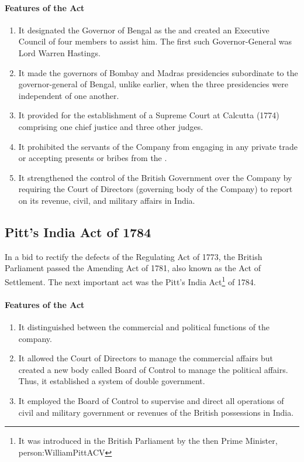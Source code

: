 \paragraph{Features of the Act}

\begin{enumerate}
  \item It designated the Governor of Bengal as the  and created an Executive Council of four members to assist him. The first such Governor-General was Lord Warren Hastings.
  \item It made the governors of Bombay and Madras presidencies subordinate to the governor-general of Bengal, unlike earlier, when the three presidencies were independent of one another.
  \item It provided for the establishment of a Supreme Court at Calcutta (1774) comprising one chief justice and three other judges.
  \item It prohibited the servants of the Company from engaging in any private trade or accepting presents or bribes from the .
  \item It strengthened the control of the British Government over the Company by requiring the Court of Directors (governing body of the Company) to report on its revenue, civil, and military affairs in India.
\end{enumerate}

\subsection{Pitt's India Act of 1784}

In a bid to rectify the defects of the Regulating Act of 1773, the British Parliament passed the Amending Act of 1781, also known as the Act of Settlement. The next important act was the Pitt's India Act\footnote{It was introduced in the British Parliament by the then Prime Minister, \gls{person:WilliamPittACV}} of 1784.

\paragraph{Features of the Act}
\begin{enumerate}
  \item It distinguished between the commercial and political functions of the company.
  \item It allowed the Court of Directors to manage the commercial affairs but created a new body called Board of Control to manage the political affairs. Thus, it established a system of double government.
  \item It employed the Board of Control to supervise and direct all operations of civil and military government or revenues of the British possessions in India.
\end{enumerate}

